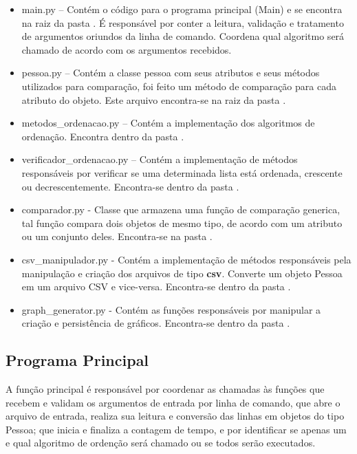 \documentclass[a4paper,12pt]{scrartcl}
\begin{document}
\begin{itemize}
	\item main.py – Contém o código para o programa principal (Main) e se encontra na raiz da pasta . É responsável por conter a leitura, validação e tratamento de argumentos oriundos da linha de comando. Coordena qual algoritmo será chamado de acordo com os argumentos recebidos.
	
	\item pessoa.py – Contém a classe pessoa com seus atributos e seus métodos utilizados para comparação, foi feito um método de comparação para cada atributo do objeto. Este arquivo encontra-se na raiz da pasta .
	
	\item metodos\_ordenacao.py – Contém a implementação dos algoritmos de ordenação. Encontra dentro da pasta .
	
	\item verificador\_ordenacao.py – Contém a implementação de métodos responsáveis por verificar se uma determinada lista está ordenada, crescente ou decrescentemente. Encontra-se dentro da pasta .
	
	\item comparador.py - Classe que armazena uma função de comparação generica, tal função compara dois objetos de mesmo tipo, de acordo com um atributo ou um conjunto deles. Encontra-se na pasta .
	
	\item csv\_manipulador.py - Contém a implementação de métodos responsáveis pela manipulação e criação dos arquivos de tipo \textbf{csv}. Converte um objeto Pessoa em um arquivo CSV e vice-versa. Encontra-se dentro da pasta .
	
    \item graph\_generator.py - Contém as funções responsáveis por manipular a criação e persistência de gráficos. Encontra-se dentro da pasta .
\end{itemize}

\subsection{Programa Principal}
A função principal é responsável por coordenar as chamadas às funções que recebem e validam os argumentos de entrada por linha de comando, que abre o arquivo de entrada, realiza sua leitura e conversão das linhas em objetos do tipo Pessoa; que inicia e finaliza a contagem de tempo, e por identificar se apenas um e qual algoritmo de ordenção será chamado ou se todos serão executados.
\end{document}
